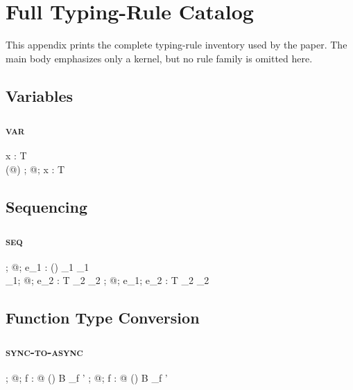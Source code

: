 \section{Full Typing-Rule Catalog}
\label{sec:appendix-full}

This appendix prints the complete typing-rule inventory used by the paper. The main body emphasizes only a kernel, but no rule family is omitted here.

\subsection{Variables}

\subsubsection{\textsc{var}}

  {x : T \at \rho \in \Gamma \\ \rho \in \Accessible(@\kappa)}
  {\Gamma;\; @\kappa;\; \alpha \vdash x : T \at \rho \dashv \Gamma}

\subsection{Sequencing}

\subsubsection{\textsc{seq}}

  {\Gamma;\; @\kappa;\; \alpha \vdash e_1 : () \at \rho_1 \dashv \Gamma_1 \\
   \Gamma_1;\; @\kappa;\; \alpha \vdash e_2 : T \at \rho_2 \dashv \Gamma_2}
  {\Gamma;\; @\kappa;\; \alpha \vdash e_1;\; e_2 : T \at \rho_2 \dashv \Gamma_2}

\subsection{Function Type Conversion}

\subsubsection{\textsc{sync-to-async}}

  {\Gamma;\; @\kappa;\; \alpha \vdash f : @\varphi\; () \to B \at \rho_f \dashv \Gamma'}
  {\Gamma;\; @\kappa;\; \alpha \vdash f : @\varphi\; ()\;  \to B \at \rho_f \dashv \Gamma'}

